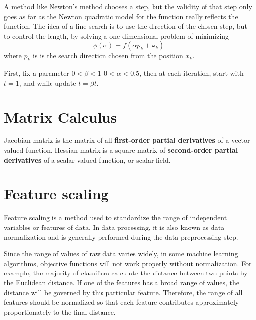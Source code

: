  A method like Newton's method chooses a step, but the validity of that step only goes as far as the Newton quadratic model for the function really reflects the function. The idea of a line search is to use the direction of the chosen step, but to control the length, by solving a one-dimensional problem of minimizing
\[
\phi(\alpha) = f(\alpha p_k + x_k)
\]
where $p_k$ is is the search direction chosen from the position $x_k$.

First, fix a parameter $0 < \beta < 1, 0 < \alpha < 0.5$, then at each iteration, start with $t = 1$, and while 
update $t = \beta t$. 


\section{Matrix Calculus}

Jacobian matrix is the matrix of all \textbf{first-order partial derivatives} of a vector-valued function.
Hessian matrix is a square matrix of \textbf{second-order partial derivatives} of a scalar-valued function, or scalar field.

\section{Feature scaling}
Feature scaling is a method used to standardize the range of independent variables or features of data. In data processing, it is also known as data normalization and is generally performed during the data preprocessing step.


Since the range of values of raw data varies widely, in some machine learning algorithms, objective functions will not work properly without normalization. For example, the majority of classifiers calculate the distance between two points by the Euclidean distance. If one of the features has a broad range of values, the distance will be governed by this particular feature. Therefore, the range of all features should be normalized so that each feature contributes approximately proportionately to the final distance.

